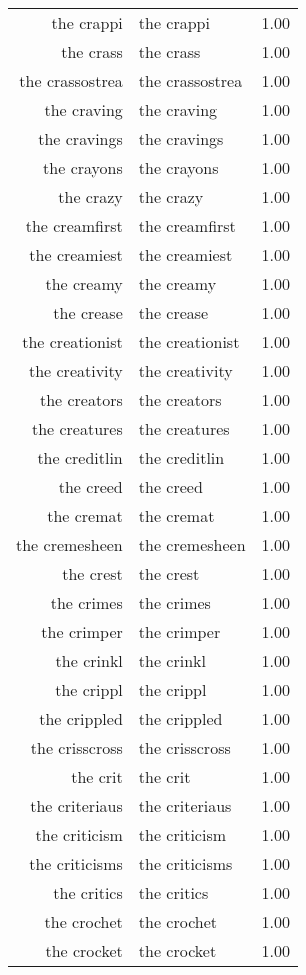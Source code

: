 \begin{table}[ht]
\begin{tabular}{rlr}
  the crappi & the crappi & 1.00 \\ 
  the crass & the crass & 1.00 \\ 
  the crassostrea & the crassostrea & 1.00 \\ 
  the craving & the craving & 1.00 \\ 
  the cravings & the cravings & 1.00 \\ 
  the crayons & the crayons & 1.00 \\ 
  the crazy & the crazy & 1.00 \\ 
  the creamfirst & the creamfirst & 1.00 \\ 
  the creamiest & the creamiest & 1.00 \\ 
  the creamy & the creamy & 1.00 \\ 
  the crease & the crease & 1.00 \\ 
  the creationist & the creationist & 1.00 \\ 
  the creativity & the creativity & 1.00 \\ 
  the creators & the creators & 1.00 \\ 
  the creatures & the creatures & 1.00 \\ 
  the creditlin & the creditlin & 1.00 \\ 
  the creed & the creed & 1.00 \\ 
  the cremat & the cremat & 1.00 \\ 
  the cremesheen & the cremesheen & 1.00 \\ 
  the crest & the crest & 1.00 \\ 
  the crimes & the crimes & 1.00 \\ 
  the crimper & the crimper & 1.00 \\ 
  the crinkl & the crinkl & 1.00 \\ 
  the crippl & the crippl & 1.00 \\ 
  the crippled & the crippled & 1.00 \\ 
  the crisscross & the crisscross & 1.00 \\ 
  the crit & the crit & 1.00 \\ 
  the criteriaus & the criteriaus & 1.00 \\ 
  the criticism & the criticism & 1.00 \\ 
  the criticisms & the criticisms & 1.00 \\ 
  the critics & the critics & 1.00 \\ 
  the crochet & the crochet & 1.00 \\ 
  the crocket & the crocket & 1.00 \\ 

\end{tabular}
\end{table}
